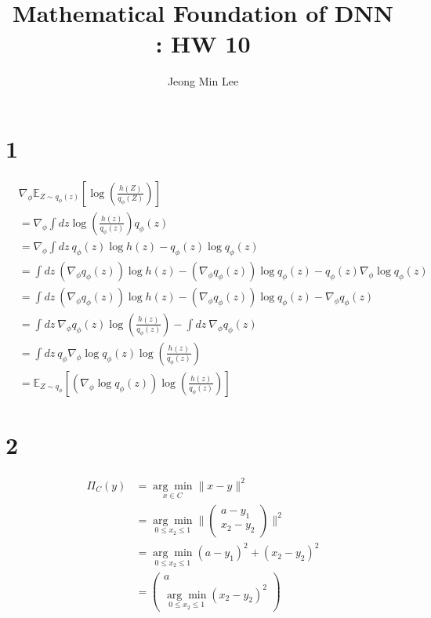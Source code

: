 \documentclass[10pt]{article}
\title{\textbf{Mathematical Foundation of DNN : HW 10}}
\author{Jeong Min Lee}
\begin{document}
\maketitle

\section*{1}
\begin{align*}
    &\nabla_{\phi} \mathbb{E}_{Z\sim q_{\phi}(z)}\left[\log \left(\frac{h(Z)}{q_{\phi}(Z)}\right)\right] \\
    &= \nabla_{\phi}\int dz \log \left(\frac{h(z)}{q_{\phi}(z)}\right)q_{\phi}(z) \\
    &= \nabla_{\phi} \int dz\ q_{\phi}(z)\log h(z) - q_{\phi} (z)\log q_{\phi}(z) \\ 
    &= \int dz \ \left(\nabla_\phi q_\phi(z)\right) \log h(z) - \left(\nabla_\phi q_\phi(z)\right) \log q_{\phi}(z) - q_\phi(z) \nabla_\phi \log q_\phi(z)\\
    &= \int dz \ \left(\nabla_\phi q_\phi(z)\right) \log h(z) - \left(\nabla_\phi q_\phi(z)\right) \log q_{\phi}(z) - \nabla_\phi q_\phi(z) \\
    &= \int dz \ \nabla_\phi q_\phi(z)\log \left(\frac{h(z)}{q_\phi(z)}\right) - \int dz \ \nabla_\phi q_\phi(z) \\
    &= \int dz \ q_\phi \nabla_\phi \log q_\phi(z) \log \left(\frac{h(z)}{q_\phi(z)}\right) \\
    &= \mathbb{E}_{Z \sim q_\phi}\left[\left(\nabla_\phi \log q_\phi(z)\right) \log \left(\frac{h(z)}{q_\phi(z)}\right)\right]
\end{align*}
\section*{2}
\begin{align*}
    \Pi_C(y) &= \underset{x\in C}{\arg\min} \lVert x - y \rVert^2 \\
    &= \underset{0 \le x_2 \le 1}{\arg\min} \bigg\lVert \begin{pmatrix}
        a-y_1 \\ x_2 - y_2
    \end{pmatrix}\bigg\rVert^2 \\
    &= \underset{0 \le x_2 \le 1}{\arg\min} (a-y_1)^2 + (x_2 - y_2)^2 \\
    &= \begin{pmatrix} a \\ \underset{0 \le x_2 \le 1}{\arg\min} (x_2 - y_2)^2 \end{pmatrix}
\end{align*}
\end{document}

